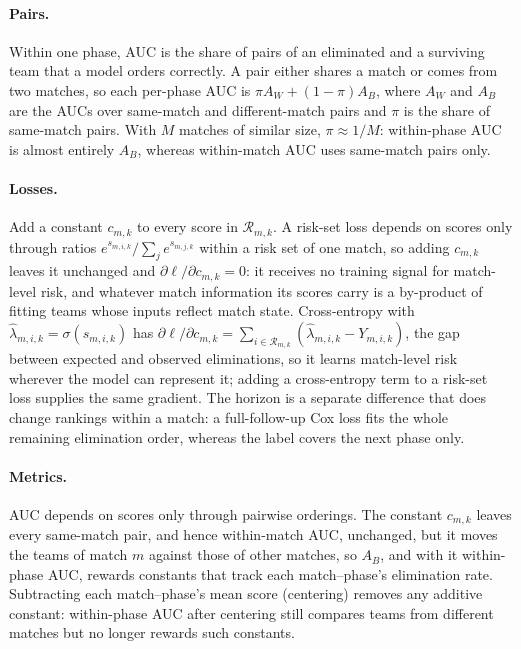 \documentclass[sigconf,anonymous,nonacm]{acmart}
\begin{document}
\paragraph{Pairs.}
Within one phase, AUC is the share of pairs of an eliminated and a surviving team that a model orders correctly. A pair either shares a match or comes from two matches, so each per-phase AUC is $\pi A_W+(1-\pi)A_B$, where $A_W$ and $A_B$ are the AUCs over same-match and different-match pairs and $\pi$ is the share of same-match pairs. With $M$ matches of similar size, $\pi\approx1/M$: within-phase AUC is almost entirely $A_B$, whereas within-match AUC uses same-match pairs only.

\paragraph{Losses.}
Add a constant $c_{m,k}$ to every score in $\mathcal{R}_{m,k}$. A risk-set loss depends on scores only through ratios $e^{s_{m,i,k}}/\sum_{j}e^{s_{m,j,k}}$ within a risk set of one match, so adding $c_{m,k}$ leaves it unchanged and $\partial\ell/\partial c_{m,k}=0$: it receives no training signal for match-level risk, and whatever match information its scores carry is a by-product of fitting teams whose inputs reflect match state. Cross-entropy with $\hat\lambda_{m,i,k}=\sigma(s_{m,i,k})$ has $\partial\ell/\partial c_{m,k}=\sum_{i\in\mathcal{R}_{m,k}}(\hat\lambda_{m,i,k}-Y_{m,i,k})$, the gap between expected and observed eliminations, so it learns match-level risk wherever the model can represent it; adding a cross-entropy term to a risk-set loss supplies the same gradient. The horizon is a separate difference that does change rankings within a match: a full-follow-up Cox loss fits the whole remaining elimination order, whereas the label covers the next phase only.

\paragraph{Metrics.}
AUC depends on scores only through pairwise orderings. The constant $c_{m,k}$ leaves every same-match pair, and hence within-match AUC, unchanged, but it moves the teams of match $m$ against those of other matches, so $A_B$, and with it within-phase AUC, rewards constants that track each match--phase's elimination rate. Subtracting each match--phase's mean score (centering) removes any additive constant: within-phase AUC after centering still compares teams from different matches but no longer rewards such constants.
\end{document}
